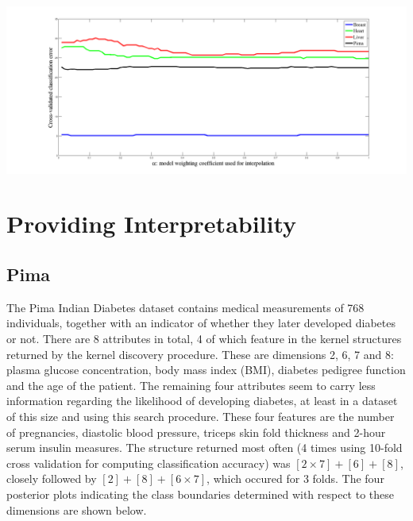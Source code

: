 \documentclass[a4paper,12pt ]{report}
\begin{document}
\begin{table}[h]
\begin{minipage}{0.55\textwidth}
\begin{tabular}{|c | c | c | }
 \end{tabular}

\end{minipage}%



\end{table}

\includegraphics[trim=8cm 5cm 8cm 4cm, width=\textwidth]{figures/alphaBMA.png}%


\clearpage

\section{Providing Interpretability}

\subsection{Pima}

The Pima Indian Diabetes dataset contains medical measurements of 768 individuals, together with an indicator of whether they later developed diabetes or not. There are 8 attributes in total, 4 of which feature in the kernel structures returned by the kernel discovery procedure. 
These are dimensions 2, 6, 7 and 8: plasma glucose concentration, body mass index (BMI), diabetes pedigree function and the age of the patient. The remaining four attributes seem to carry less information regarding the likelihood of developing diabetes, at least 
in a dataset of this size and using this search procedure. These four features are the number of pregnancies, diastolic blood pressure, triceps skin fold thickness and 2-hour serum insulin measures. The structure returned most often (4 times using 10-fold cross validation 
for computing classification accuracy) was $[2\times7] + [6] + [8]$, closely followed by $[2]+[8]+[6 \times 7]$, which occured for 3 folds. The four posterior plots indicating the class boundaries determined with respect to these dimensions are shown below. 
\end{document}
